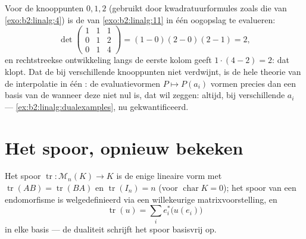 \begin{example}\label{ex:b2:linalg:vandermondework}
Voor de knooppunten $0, 1, 2$ (gebruikt door kwadratuurformules
zoals die van \cref{exo:b2:linalg:4}) is de
 van \cref{exo:b2:linalg:11} in één
oogopslag te evalueren:
\[
\det\begin{pmatrix}
1 & 1 & 1\\
0 & 1 & 2\\
0 & 1 & 4
\end{pmatrix}
= (1 - 0)(2 - 0)(2 - 1) = 2 ,
\]
en rechtstreekse ontwikkeling langs de eerste kolom geeft
$1\cdot(4 - 2) = 2$: dat klopt. Dat de  bij
verschillende knooppunten niet verdwijnt, is de hele theorie van
de interpolatie in één : de evaluatievormen $P \mapsto
P(a_i)$ vormen precies dan een basis van de  wanneer
deze  niet nul is, dat wil zeggen: altijd, bij
verschillende $a_i$ --- \cref{ex:b2:linalg:dualexamples}, nu
gekwantificeerd.
\end{example}

\section{Het spoor, opnieuw bekeken}

\begin{proposition}\label{prop:b2:linalg:trace}
Het spoor $\operatorname{tr} \colon \mathcal{M}_n(K) \to K$ is de
enige lineaire vorm met $\operatorname{tr}(AB) =
\operatorname{tr}(BA)$ en $\operatorname{tr}(I_n) = n$ (voor
$\operatorname{char} K = 0$); het spoor van een endomorfisme is
welgedefinieerd via een willekeurige matrixvoorstelling, en
\[
\operatorname{tr}(u) = \sum_{i} e_i^*\bigl(u(e_i)\bigr)
\]
in elke basis --- de dualiteit schrijft het spoor basisvrij op.
\end{proposition}

